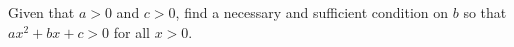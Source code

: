 Given that $a > 0$ and $c > 0$, find a necessary and sufficient condition on
$b$ so that $ax^2 + bx + c > 0$ for all $x > 0$.
